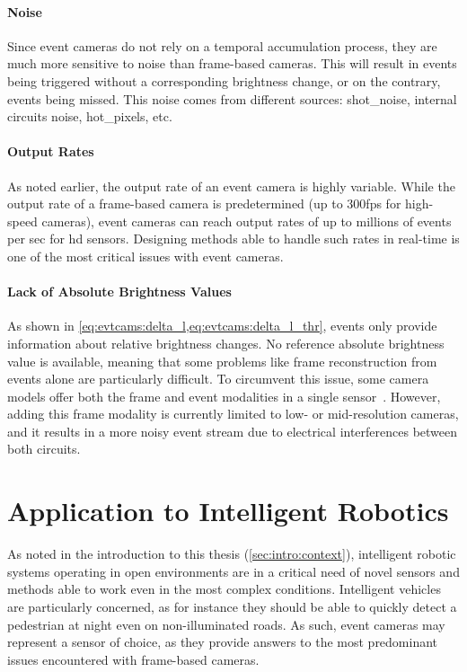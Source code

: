 \paragraph{Noise}
Since event cameras do not rely on a temporal accumulation process, they are much more sensitive to noise than frame-based cameras. This will result in events being triggered without a corresponding brightness change, or on the contrary, events being missed. This noise comes from different sources: \gls{shot_noise}, internal circuits noise, \glspl{hot_pixel}, etc.

\paragraph{Output Rates}
As noted earlier, the output rate of an event camera is highly variable. While the output rate of a frame-based camera is predetermined (up to 300\acrshort{fps} for high-speed cameras), event cameras can reach output rates of up to millions of events per sec for \acrshort{hd} sensors. Designing methods able to handle such rates in real-time is one of the most critical issues with event cameras.

\paragraph{Lack of Absolute Brightness Values}
As shown in \cref{eq:evtcams:delta_l,eq:evtcams:delta_l_thr}, events only provide information about relative brightness changes. No reference absolute brightness value is available, meaning that some problems like frame reconstruction from events alone are particularly difficult. To circumvent this issue, some camera models offer both the frame and event modalities in a single sensor~\cite{Brandli2014A2,Posch2011AQ1}. However, adding this frame modality is currently limited to low- or mid-resolution cameras, and it results in a more noisy event stream due to electrical interferences between both circuits.

\section{Application to Intelligent Robotics}
As noted in the introduction to this thesis (\cref{sec:intro:context}), intelligent robotic systems operating in open environments are in a critical need of novel sensors and methods able to work even in the most complex conditions. Intelligent vehicles are particularly concerned, as for instance they should be able to quickly detect a pedestrian at night even on non-illuminated roads. As such, event cameras may represent a sensor of choice, as they provide answers to the most predominant issues encountered with frame-based cameras.

